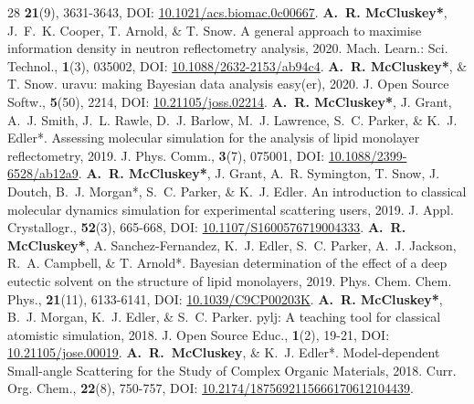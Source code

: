 \begin{paperenumerate}{28}
    {\textbf{21}(9), 3631-3643,}
    {DOI: \href{https://doi.org/10.1021/acs.biomac.0c00667}{10.1021/acs.biomac.0c00667}.}
  \cvpaper
    {\textbf{A.~R. McCluskey*}, J.~F.~K. Cooper, T. Arnold, \& T. Snow.}
    {A general approach to maximise information density in neutron reflectometry analysis,}
    {2020.}
    {Mach. Learn.: Sci. Technol.,}
    {\textbf{1}(3), 035002,}
    {DOI: \href{https://doi.org/10.1088/2632-2153/ab94c4}{10.1088/2632-2153/ab94c4}.}
  \cvpaper
    {\textbf{A.~R. McCluskey*}, \& T. Snow.}
    {uravu: making Bayesian data analysis easy(er),}
    {2020.}
    {J. Open Source Softw.,}
    {\textbf{5}(50), 2214,}
    {DOI: \href{https://doi.org/10.21105/joss.02214}{10.21105/joss.02214}.}
  \cvpaper
    {\textbf{A.~R. McCluskey*}, J. Grant, A.~J. Smith, J.~L. Rawle, D.~J. Barlow, M.~J. Lawrence, S.~C. Parker, \& K.~J. Edler*.}
    {Assessing molecular simulation for the analysis of lipid monolayer reflectometry,}
    {2019.}
    {J. Phys. Comm.,}
    {\textbf{3}(7), 075001,}
    {DOI: \href{https://doi.org/10.1088/2399-6528/ab12a9}{10.1088/2399-6528/ab12a9}.}
  \cvpaper
    {\textbf{A.~R. McCluskey*}, J. Grant, A.~R. Symington, T. Snow, J. Doutch, B.~J. Morgan*, S.~C. Parker, \& K.~J. Edler.}
    {An introduction to classical molecular dynamics simulation for experimental scattering users,}
    {2019.}
    {J. Appl. Crystallogr.,}
    {\textbf{52}(3), 665-668,}
    {DOI: \href{https://doi.org/10.1107/S1600576719004333}{10.1107/S1600576719004333}.}
  \cvpaper
    {\textbf{A.~R. McCluskey*}, A. Sanchez-Fernandez, K.~J. Edler, S.~C. Parker, A.~J. Jackson, R.~A. Campbell, \& T. Arnold*.}
    {Bayesian determination of the effect of a deep eutectic solvent on the structure of lipid monolayers,}
    {2019.}
    {Phys. Chem. Chem. Phys.,}
    {\textbf{21}(11), 6133-6141,}
    {DOI: \href{https://doi.org/10.1039/C9CP00203K}{10.1039/C9CP00203K}.}
  \cvpaper
    {\textbf{A.~R. McCluskey*}, B.~J. Morgan, K.~J. Edler, \& S.~C. Parker.}
    {pylj: A teaching tool for classical atomistic simulation,}
    {2018.}
    {J. Open Source Educ.,}
    {\textbf{1}(2), 19-21,}
    {DOI: \href{http://doi.org/10.21105/jose.00019}{10.21105/jose.00019}.}
  \cvpaper
    {\textbf{A.~R.~McCluskey}, \& K.~J. Edler*.}
    {Model-dependent Small-angle Scattering for the Study of Complex Organic Materials,}
    {2018.}
    {Curr. Org. Chem.,}
    {\textbf{22}(8), 750-757,}
    {DOI: \href{http://doi.org/10.2174/1875692115666170612104439}{10.2174/1875692115666170612104439}.}
\end{paperenumerate}
\vspace{-20pt}
